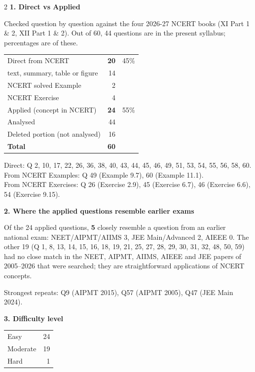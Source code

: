 \begin{multicols}{2}
\textbf{\color{crimson}1. Direct vs Applied}\par\smallskip
{\footnotesize Checked question by question against the four 2026-27 NCERT books (XI Part 1 \& 2, XII Part 1 \& 2). Out of 60, 44 questions are in the present syllabus; percentages are of these.}\par\smallskip
\begin{tabular}{@{}lrr@{}}\toprule
Direct from NCERT & \textbf{20} & 45\%\\
\quad text, summary, table or figure & 14 &\\
\quad NCERT solved Example & 2 &\\
\quad NCERT Exercise & 4 &\\
Applied (concept in NCERT) & \textbf{24} & 55\%\\\midrule
Analysed & 44 &\\
Deleted portion (not analysed) & 16 &\\\midrule
\textbf{Total} & \textbf{60} &\\\bottomrule\end{tabular}\par\smallskip
{\footnotesize Direct: Q 2, 10, 17, 22, 26, 36, 38, 40, 43, 44, 45, 46, 49, 51, 53, 54, 55, 56, 58, 60.\\ From NCERT Examples: Q 49 (Example 9.7), 60 (Example 11.1).\\ From NCERT Exercises: Q 26 (Exercise 2.9), 45 (Exercise 6.7), 46 (Exercise 6.6), 54 (Exercise 9.15).}\par\medskip
\textbf{\color{crimson}2. Where the applied questions resemble earlier exams}\par\smallskip
Of the 24 applied questions, \textbf{5} closely resemble a question from an earlier national exam:
NEET/AIPMT/AIIMS 3, JEE Main/Advanced 2, AIEEE 0. The other 19 (Q 1, 8, 13, 14, 15, 16, 18, 19, 21, 25, 27, 28, 29, 30, 31, 32, 48, 50, 59) had no close match in the NEET, AIPMT, AIIMS, AIEEE and JEE papers of 2005--2026 that were searched; they are straightforward applications of NCERT concepts.\par
{\footnotesize Strongest repeats: Q9 (AIPMT 2015), Q57 (AIPMT 2005), Q47 (JEE Main 2024).}\par\medskip
\textbf{\color{crimson}3. Difficulty level}\par\smallskip
\begin{tabular}{@{}lr@{}}\toprule
Easy & 24\\ Moderate & 19\\ Hard & 1\\\bottomrule\end{tabular}\par\smallskip

\end{multicols}

